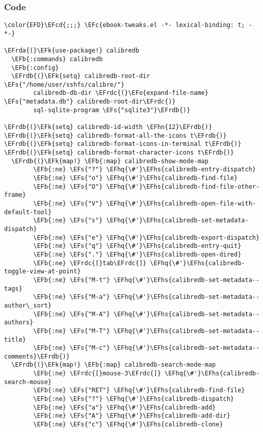 \documentclass[a4wide,10pt]{article}
\newcommand{\EFc}[1]{\textcolor{EFc}{#1}} %
\newcommand{\EFcd}[1]{\textcolor{EFcd}{#1}} %
\newcommand{\EFs}[1]{\textcolor{EFs}{#1}} %
\newcommand{\EFk}[1]{\textcolor{EFk}{#1}} %
\newcommand{\EFb}[1]{\textcolor{EFb}{#1}} %
\newcommand{\EFo}[1]{\textcolor{EFo}{#1}} %
\newcommand{\EFhn}[1]{\textcolor{EFhn}{\textbf{#1}}} %
\newcommand{\EFhq}[1]{\textcolor{EFhq}{#1}} %
\newcommand{\EFhs}[1]{\textcolor{EFhs}{#1}} %
\newcommand{\EFrda}[1]{\textcolor{EFrda}{#1}} %
\newcommand{\EFrdb}[1]{\textcolor{EFrdb}{#1}} %
\newcommand{\EFrdc}[1]{\textcolor{EFrdc}{#1}} %
\begin{document}
\subsubsection{Code}
\label{sec:orga12d2d2}
\begin{Code}
\begin{Verbatim}
\color{EFD}\EFcd{;;;} \EFc{ebook-tweaks.el -*- lexical-binding: t; -*-}

\EFrda{(}\EFk{use-package!} calibredb
  \EFb{:commands} calibredb
  \EFb{:config}
  \EFrdb{(}\EFk{setq} calibredb-root-dir \EFs{"/home/user/sshfs/calibre/"}
        calibredb-db-dir \EFrdc{(}\EFo{expand-file-name} \EFs{"metadata.db"} calibredb-root-dir\EFrdc{)}
        sql-sqlite-program \EFs{"sqlite3"}\EFrdb{)}

\EFrdb{(}\EFk{setq} calibredb-id-width \EFhn{12}\EFrdb{)}
\EFrdb{(}\EFk{setq} calibredb-format-all-the-icons t\EFrdb{)}
\EFrdb{(}\EFk{setq} calibredb-format-icons-in-terminal t\EFrdb{)}
\EFrdb{(}\EFk{setq} calibredb-format-character-icons t\EFrdb{)}
  \EFrdb{(}\EFk{map!} \EFb{:map} calibredb-show-mode-map
        \EFb{:ne} \EFs{"?"} \EFhq{\#'}\EFhs{calibredb-entry-dispatch}
        \EFb{:ne} \EFs{"o"} \EFhq{\#'}\EFhs{calibredb-find-file}
        \EFb{:ne} \EFs{"O"} \EFhq{\#'}\EFhs{calibredb-find-file-other-frame}
        \EFb{:ne} \EFs{"V"} \EFhq{\#'}\EFhs{calibredb-open-file-with-default-tool}
        \EFb{:ne} \EFs{"s"} \EFhq{\#'}\EFhs{calibredb-set-metadata-dispatch}
        \EFb{:ne} \EFs{"e"} \EFhq{\#'}\EFhs{calibredb-export-dispatch}
        \EFb{:ne} \EFs{"q"} \EFhq{\#'}\EFhs{calibredb-entry-quit}
        \EFb{:ne} \EFs{"."} \EFhq{\#'}\EFhs{calibredb-open-dired}
        \EFb{:ne} \EFrdc{[}tab\EFrdc{]} \EFhq{\#'}\EFhs{calibredb-toggle-view-at-point}
        \EFb{:ne} \EFs{"M-t"} \EFhq{\#'}\EFhs{calibredb-set-metadata--tags}
        \EFb{:ne} \EFs{"M-a"} \EFhq{\#'}\EFhs{calibredb-set-metadata--author\_sort}
        \EFb{:ne} \EFs{"M-A"} \EFhq{\#'}\EFhs{calibredb-set-metadata--authors}
        \EFb{:ne} \EFs{"M-T"} \EFhq{\#'}\EFhs{calibredb-set-metadata--title}
        \EFb{:ne} \EFs{"M-c"} \EFhq{\#'}\EFhs{calibredb-set-metadata--comments}\EFrdb{)}
  \EFrdb{(}\EFk{map!} \EFb{:map} calibredb-search-mode-map
        \EFb{:ne} \EFrdc{[}mouse-3\EFrdc{]} \EFhq{\#'}\EFhs{calibredb-search-mouse}
        \EFb{:ne} \EFs{"RET"} \EFhq{\#'}\EFhs{calibredb-find-file}
        \EFb{:ne} \EFs{"?"} \EFhq{\#'}\EFhs{calibredb-dispatch}
        \EFb{:ne} \EFs{"a"} \EFhq{\#'}\EFhs{calibredb-add}
        \EFb{:ne} \EFs{"A"} \EFhq{\#'}\EFhs{calibredb-add-dir}
        \EFb{:ne} \EFs{"c"} \EFhq{\#'}\EFhs{calibredb-clone}

\end{Verbatim}
\end{Code}
\end{document}
